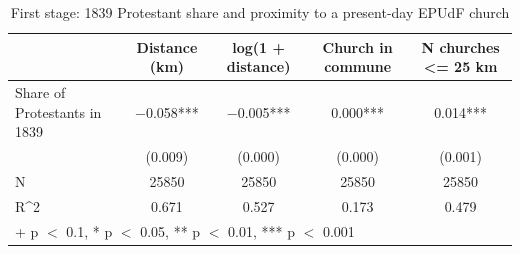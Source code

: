 \begin{table}
\centering
\caption{First stage: 1839 Protestant share and proximity to a present-day EPUdF church}
\centering
\begin{tabular}[t]{lcccc}
\toprule
  & Distance (km) & log(1 + distance) & Church in commune & N churches <= 25 km\\
\midrule
Share of Protestants in 1839 & \num{-0.058}*** & \num{-0.005}*** & \num{0.000}*** & \num{0.014}***\\
 & (\num{0.009}) & (\num{0.000}) & (\num{0.000}) & (\num{0.001})\\
\midrule
N & \num{25850} & \num{25850} & \num{25850} & \num{25850}\\
R\textasciicircum{}2 & \num{0.671} & \num{0.527} & \num{0.173} & \num{0.479}\\
\bottomrule
\multicolumn{5}{l}{\rule{0pt}{1em}+ p $<$ 0.1, * p $<$ 0.05, ** p $<$ 0.01, *** p $<$ 0.001}\\
\end{tabular}
\end{table}
